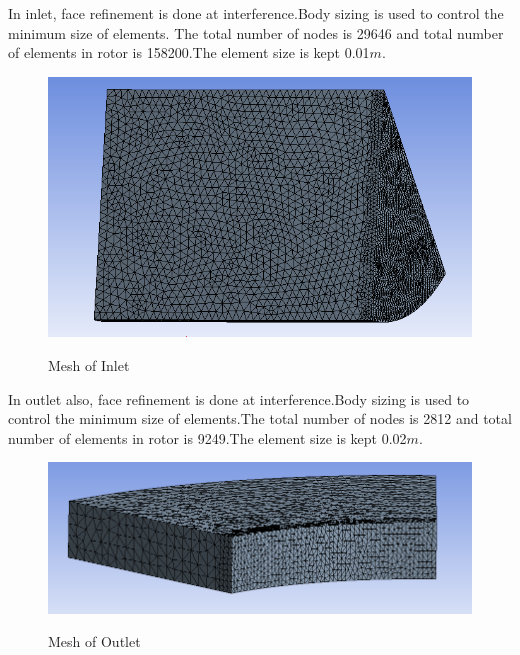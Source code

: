 \documentclass[11pt]{article}
\begin{document}
In inlet, face refinement is done at interference.Body sizing is used to control the minimum size of elements. The total number of nodes is 29646 and total number of elements in rotor is 158200.The element size is kept 0.01$m$.
   \begin{center}
 \begin{figure}[H]
 \centering
 \includegraphics[scale=1]{inletmesh.png}\\
 \caption{Mesh of Inlet}
 \end{figure}
 \end{center}
  In outlet also, face refinement is done at interference.Body sizing is used to control the minimum size of elements.The total number of nodes is 2812 and total number of elements in rotor is 9249.The element size is kept 0.02$m$.
 \begin{center}
 \begin{figure}[H]
 \centering
 \includegraphics[scale=.6]{outletmesh.png}\\
 \caption{Mesh of Outlet}
 \end{figure}
 \end{center}
\end{document}
